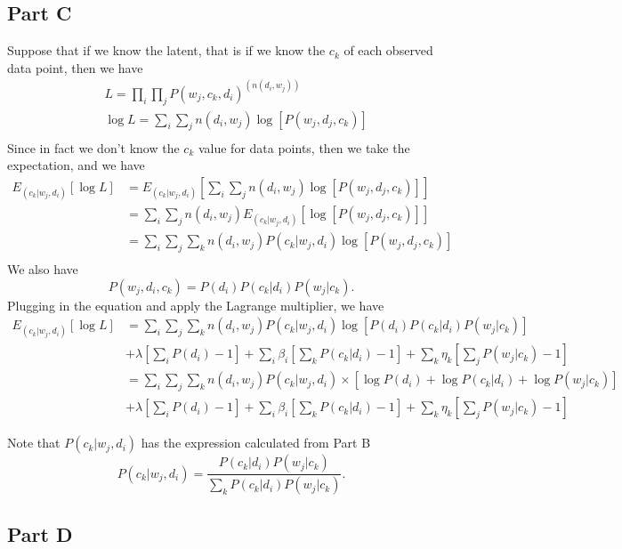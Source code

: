 \subsection{Part C}
Suppose that if we know the latent, that is if we know the $c_k$ of each observed data point, then we have
\begin{align*}
& L=\prod\limits_{i}\prod\limits_{j}P(w_j,c_k,d_i)^{(n(d_i,w_j))}\\
& \log{L}=\sum\limits_{i}\sum\limits_{j}n(d_i,w_j)\log{[P(w_j,d_j,c_k)]} \\
\end{align*}
Since in fact we don't know the $c_k$ value for data points, then we take the expectation, and we have
\begin{align*}
E_{(c_k|w_j,d_i)}[\log{L}]
& =E_{(c_k|w_j,d_i)}[\sum\limits_{i}\sum\limits_{j}n(d_i,w_j)\log{[P(w_j,d_j,c_k)]}]\\
& =\sum\limits_{i}\sum\limits_{j}n(d_i,w_j)E_{(c_k|w_j,d_i)}[\log{[P(w_j,d_j,c_k)]}]\\
& =\sum\limits_{i}\sum\limits_{j}\sum\limits_{k}n(d_i,w_j)P(c_k|w_j,d_i)\log{[P(w_j,d_j,c_k)]}\\
\end{align*}
We also have
\[ P(w_j,d_i,c_k)=P(d_i)P(c_k|d_i)P(w_j|c_k).
\]
Plugging in the equation and apply the Lagrange multiplier, we have 
\begin{align*}
E_{(c_k|w_j,d_i)}[\log{L}]
& =\sum\limits_{i}\sum\limits_{j}\sum\limits_{k}n(d_i,w_j)P(c_k|w_j,d_i)\log{[P(d_i)P(c_k|d_i)P(w_j|c_k)]} \\
& +\lambda[\sum\limits_{i}P(d_i)-1]+\sum\limits_{i}\beta_i[\sum\limits_{k}P(c_k|d_i)-1]+\sum\limits_{k}\eta_k[\sum\limits_{j}P(w_j|c_k)-1]\\
& =\sum\limits_{i}\sum\limits_{j}\sum\limits_{k}n(d_i,w_j)P(c_k|w_j,d_i)\times[\log{P(d_i)}+\log{P(c_k|d_i)}+\log{P(w_j|c_k)}] \\
&+\lambda[\sum\limits_{i}P(d_i)-1]+\sum\limits_{i}\beta_i[\sum\limits_{k}P(c_k|d_i)-1]+\sum\limits_{k}\eta_k[\sum\limits_{j}P(w_j|c_k)-1]
\end{align*}

Note that $P(c_k|w_j,d_i)$ has the expression calculated from Part B
\[P(c_k|w_j,d_i)=\dfrac{P(c_k|d_i)P(w_j|c_k)}{\sum\limits_{k}P(c_k|d_i)P(w_j|c_k)}.\]

\subsection{Part D}
